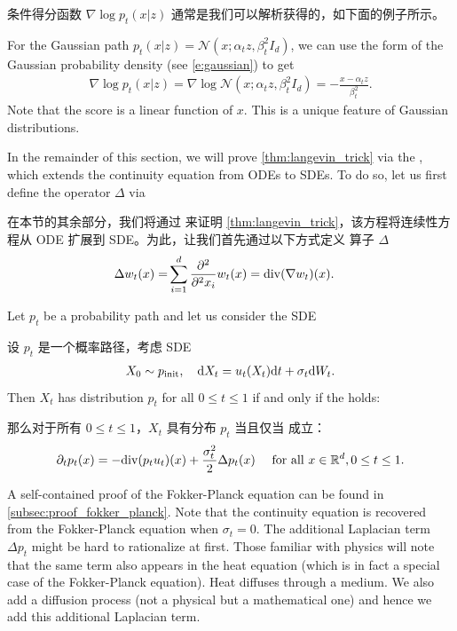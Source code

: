 条件得分函数 $\nabla \log p_t(x|z)$ 通常是我们可以解析获得的，如下面的例子所示。
\begin{examplebox} 
For the Gaussian path $p_t(x|z)=\mathcal{N}(x;\alpha_t z,\beta_t^2 I_d)$, we can use the form of the Gaussian probability density (see \cref{e:gaussian}) to get
\begin{align}
\label{eq:cond_score_gaussian}
    \nabla \log p_t(x|z) = \nabla\log \mathcal{N}(x;\alpha_t z,\beta_t^2 I_d) = -\frac{x-\alpha_t z}{\beta_t^2}.
\end{align}
Note that the score is a linear function of $x$. This is a unique feature of Gaussian distributions.
\end{examplebox}
In the remainder of this section, we will prove  \cref{thm:langevin_trick} via the , which extends the continuity equation from ODEs to SDEs. To do so, let us first define the  operator $\Delta$ via

在本节的其余部分，我们将通过  来证明 \cref{thm:langevin_trick}，该方程将连续性方程从 ODE 扩展到 SDE。为此，让我们首先通过以下方式定义  算子 $\Delta$
\begin{align}
    \label{eq:laplacian_definition}
    \Delta w_t(x)=&\sum\limits_{i=1}^{d}\frac{\partial^2}{\partial^2 x_i}w_t(x)=\mathrm{div}(\nabla w_t)(x).
\end{align}
\begin{theorem}
\label{thm:fokker_planck}
Let $p_t$ be a probability path and let us consider the SDE

设 $p_t$ 是一个概率路径，考虑 SDE
\begin{align*}
    X_0\sim p_{\rm{init}}, \quad \mathrm{d} X_t = u_t(X_t)\mathrm{d} t + \sigma_t\mathrm{d} W_t.
\end{align*}
Then $X_t$ has distribution $p_t$ for all $0\leq t\leq 1$ if and only if the  holds:

那么对于所有 $0\leq t\leq 1$，$X_t$ 具有分布 $p_t$ 当且仅当  成立：
    \begin{align}
    \label{e:fokker_planck}
    \partial_t p_t(x) = -\mathrm{div} (p_t u_t)(x)+\frac{\sigma_t^2}{2}\Delta p_t (x)\quad \text{ for all }x\in\mathbb{R}^d, 0\leq t\leq 1.
    \end{align}     
\end{theorem}
A self-contained proof of the Fokker-Planck equation can be found in \cref{subsec:proof_fokker_planck}. Note that the continuity equation is recovered from the Fokker-Planck equation when $\sigma_t=0$. The additional Laplacian term $\Delta p_t$ might be hard to rationalize at first. Those familiar with physics will note that the same term also appears in the heat equation (which is in fact a special case of the Fokker-Planck equation). Heat diffuses through a medium. We also add a diffusion process (not a physical but a mathematical one) and hence we add this additional Laplacian term. 

